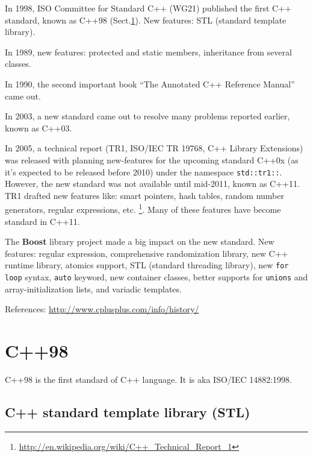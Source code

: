 In 1998, ISO Committee for Standard C++ (WG21) published the first C++ standard,
known as C++98 (Sect.\ref{sec:C++98}). New features: STL (standard template
library).

In 1989, new features: protected and static members, inheritance from several
classes. 

In 1990, the second important book ``The Annotated C++ Reference Manual'' came
out. 


In 2003, a new standard came out to resolve many problems reported earlier,
known as C++03.

In 2005, a technical report (TR1, ISO/IEC TR 19768, C++ Library Extensions) was
released with planning new-features for the upcoming standard C++0x (as it's
expected to be released before 2010) under the namespace \verb!std::tr1::!.
However, the new standard was not available until mid-2011, known as C++11. TR1
drafted new features like: smart pointers, hash tables, random number
generators, regular expressions, etc.
\footnote{\url{http://en.wikipedia.org/wiki/C++_Technical_Report_1}}. Many
of these features have become standard in C++11.

The {\bf Boost} library project made a big impact on the new standard.
New features: regular expression, comprehensive randomization library, new C++
runtime library, atomics support, STL (standard threading library), new
\verb!for loop! syntax, \verb!auto! keyword, new container classes, better
supports for \verb!unions! and array-initialization lists, and variadic
templates.


References: \url{http://www.cplusplus.com/info/history/}
 
\section{C++98}
\label{sec:C++98}

C++98 is the first standard of C++ language. It is aka ISO/IEC 14882:1998. 

\subsection{C++ standard template library (STL)}
\label{sec:C++98_STL}
\label{sec:C++_STL}

